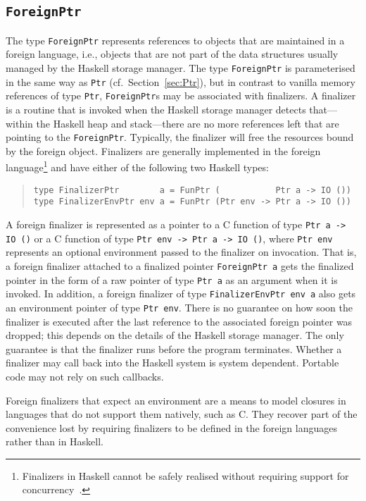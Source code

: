 \documentclass[a4paper,twoside]{article}
\newcommand{\code}[1]{\texttt{#1}}      %
\begin{document}
\subsection{\code{ForeignPtr}}
\label{sec:ForeignPtr}

The type \code{ForeignPtr} represents references to objects that are
maintained in a foreign language, i.e., objects that are not part of the data
structures usually managed by the Haskell storage manager.  The type
\code{ForeignPtr} is parameterised in the same way as \code{Ptr} (cf.\ 
Section~\ref{sec:Ptr}), but in contrast to vanilla memory references of type
\code{Ptr}, \code{ForeignPtr}s may be associated with finalizers.  A finalizer
is a routine that is invoked when the Haskell storage manager detects
that---within the Haskell heap and stack---there are no more references left
that are pointing to the \code{ForeignPtr}.  Typically, the finalizer will
free the resources bound by the foreign object.  Finalizers are generally
implemented in the foreign language\footnote{Finalizers in Haskell cannot be
  safely realised without requiring support for
  concurrency~\cite{boehm:finalizers}.} and have either of the following two
Haskell types:
%
\begin{quote}
\begin{verbatim}
type FinalizerPtr        a = FunPtr (           Ptr a -> IO ())
type FinalizerEnvPtr env a = FunPtr (Ptr env -> Ptr a -> IO ())
\end{verbatim}
\end{quote}
%
A foreign finalizer is represented as a pointer to a C function of type
\code{Ptr a -> IO ()} or a C function of type \code{Ptr env -> Ptr a -> IO
  ()}, where \code{Ptr env} represents an optional environment passed to the
finalizer on invocation.  That is, a foreign finalizer attached to a finalized
pointer \code{ForeignPtr a} gets the finalized pointer in the form of a raw
pointer of type \code{Ptr a} as an argument when it is invoked.  In addition,
a foreign finalizer of type \code{FinalizerEnvPtr env a} also gets an
environment pointer of type \code{Ptr env}.  There is no guarantee on how soon
the finalizer is executed after the last reference to the associated foreign
pointer was dropped; this depends on the details of the Haskell storage
manager.  The only guarantee is that the finalizer runs before the program
terminates.  Whether a finalizer may call back into the Haskell system is
system dependent.  Portable code may not rely on such callbacks.

Foreign finalizers that expect an environment are a means to model closures in
languages that do not support them natively, such as C.  They recover part of
the convenience lost by requiring finalizers to be defined in the foreign
languages rather than in Haskell.
\end{document}
